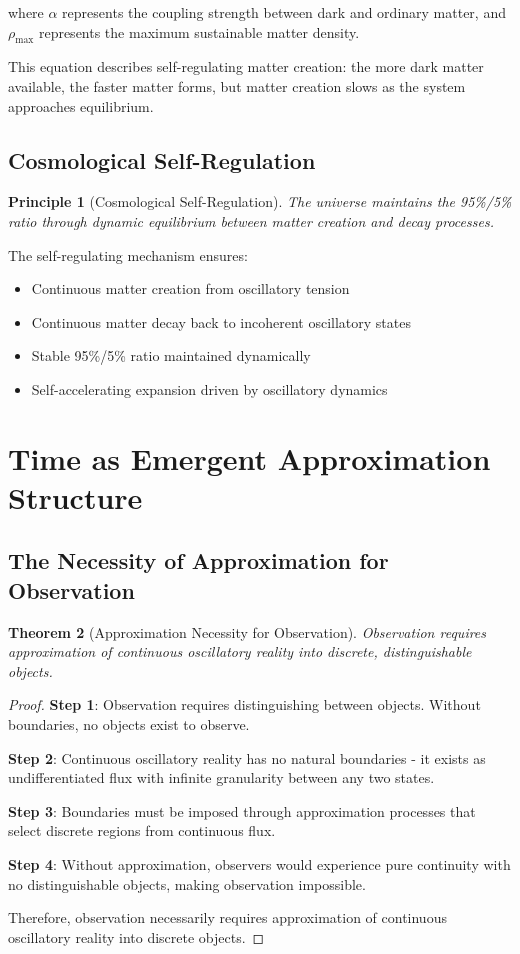 \documentclass[11pt]{article}
\newtheorem{theorem}{Theorem}[section]
\newtheorem{principle}[theorem]{Principle}
\theoremstyle{remark}
\begin{document}
where $\alpha$ represents the coupling strength between dark and ordinary matter, and $\rho_{\text{max}}$ represents the maximum sustainable matter density.

This equation describes self-regulating matter creation: the more dark matter available, the faster matter forms, but matter creation slows as the system approaches equilibrium.

\subsection{Cosmological Self-Regulation}

\begin{principle}[Cosmological Self-Regulation]
The universe maintains the 95\%/5\% ratio through dynamic equilibrium between matter creation and decay processes.
\end{principle}

The self-regulating mechanism ensures:
\begin{itemize}
\item Continuous matter creation from oscillatory tension
\item Continuous matter decay back to incoherent oscillatory states
\item Stable 95\%/5\% ratio maintained dynamically
\item Self-accelerating expansion driven by oscillatory dynamics
\end{itemize}

\section{Time as Emergent Approximation Structure}

\subsection{The Necessity of Approximation for Observation}

\begin{theorem}[Approximation Necessity for Observation]
Observation requires approximation of continuous oscillatory reality into discrete, distinguishable objects.
\end{theorem}

\begin{proof}
\textbf{Step 1}: Observation requires distinguishing between objects. Without boundaries, no objects exist to observe.

\textbf{Step 2}: Continuous oscillatory reality has no natural boundaries - it exists as undifferentiated flux with infinite granularity between any two states.

\textbf{Step 3}: Boundaries must be imposed through approximation processes that select discrete regions from continuous flux.

\textbf{Step 4}: Without approximation, observers would experience pure continuity with no distinguishable objects, making observation impossible.

Therefore, observation necessarily requires approximation of continuous oscillatory reality into discrete objects.
\end{proof}
\end{document}
